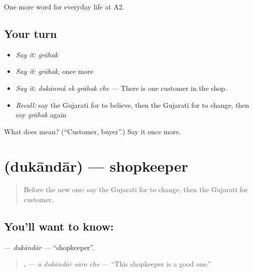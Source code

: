 \begin{grammarlens}[title={What you've built}]
One more word for everyday life at A2.
\end{grammarlens}

\subsection*{Your turn}
\begin{itemize}
\raggedright
  \item \emph{Say it:} \emph{grāhak}
  \item \emph{Say it:} \emph{grāhak}, once more
  \item \emph{Say it:} \emph{dukānmā̃ ek grāhak che} — There is one customer in the shop.
  \item \emph{Recall:} say the Gujarati for to believe, then the Gujarati for to change, then say \emph{grāhak} again
\end{itemize}

\begin{tcolorbox}[breakable,colback=teal!4,colframe=teal!35!black,title={Before you move on}]
What does  mean? (\textquotedblleft{}Customer, buyer\textquotedblright{}.) Say it once more.
\end{tcolorbox}
\section[\texorpdfstring{\gu{દુકાનદાર} (dukāndār)}{દુકાનદાર (dukāndār)}]{ (dukāndār) — shopkeeper}

\label{lesson:GU-C183-dukandar}



\begin{quote}
Before the new one: say the Gujarati for to change, then the Gujarati for customer.
\end{quote}

\subsection*{You'll want to know: }
\textbf{} — \emph{dukāndār} — \textquotedblleft{}shopkeeper\textquotedblright{}.

\begin{quote}
\textbf{   .} — \emph{ā dukāndār sāro che} — \textquotedblleft{}This shopkeeper is a good one.\textquotedblright{}
\end{quote}

